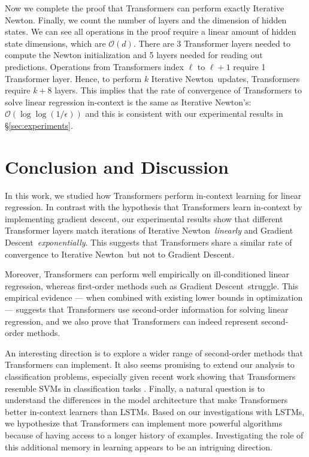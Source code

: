 \documentclass[11pt]{article}
\theoremstyle{plain}
\theoremstyle{definition}
\theoremstyle{remark}
\renewcommand{\^}[1]{^{(#1)}}
\newcommand{\gd}{Gradient Descent}
\newcommand{\newton}{Iterative Newton}
\newcommand{\new}[1]{{\color{black} {#1}}}
\begin{document}
Now we complete the proof that Transformers can perform exactly \newton. Finally, we count the number of layers and the dimension of hidden states. We can see all operations in the proof require a linear amount of hidden state dimensions, which are $\mathcal O(d)$. There are 3 Transformer layers needed to compute the Newton initialization and 5 layers needed for reading out predictions. Operations from Transformers index $\ell$ to $\ell+1$ require 1 Transformer layer. Hence, to perform $k$ \newton\ updates, Transformers require $k + 8$ layers. This implies that the rate of convergence of Transformers to solve linear regression in-context is the same as \newton's: $\mathcal O(\log \log (1/\epsilon))$ and this is consistent with our experimental results in \S\ref{sec:experiments}. 

\vspace{-1mm}
\section{Conclusion and Discussion}
\vspace{-1mm}

In this work, we studied how Transformers perform in-context learning for linear regression.
In contrast with the hypothesis that Transformers learn in-context by implementing gradient descent,
\new{our experimental results show that different Transformer layers match iterations of \newton\  \textit{linearly} and \gd\ \textit{exponentially}. This suggests that Transformers share a similar rate of convergence to \newton\ but not to \gd.}

Moreover, Transformers can perform well empirically on ill-conditioned linear regression, whereas first-order methods such as \gd\ struggle. {This empirical evidence --- when combined with existing lower bounds in optimization --- suggests that Transformers use second-order information for solving linear regression, and we also prove that Transformers can indeed represent second-order methods. } 

An interesting direction is to explore a wider range of second-order methods that Transformers can implement. It also seems promising to  extend our analysis to classification problems, especially given 
recent work showing that Transformers resemble SVMs in classification tasks \citep{Li2023TransformersAA,AtaeeTarzanagh2023TransformersAS}. 
Finally, a natural question is to understand the differences in the  model architecture that make Transformers better in-context learners than LSTMs. Based on our investigations with LSTMs, we hypothesize that Transformers can implement more powerful algorithms because of having access to a longer history of examples. 
 Investigating the role of this additional memory in learning appears to be an intriguing direction.
\end{document}
